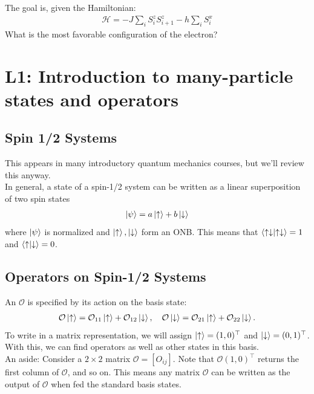 \documentclass{book}
\theoremstyle{definition}
\newcommand{\had}{\mathcal{H}}
\begin{document}
The goal is, given the Hamiltonian:
\begin{align}
\had = -J \sum_i S^z_i S^z_{i+1} - h \sum_i S^x_i
\end{align}
What is the most favorable configuration of the electron?

\section{L1: Introduction to many-particle states and operators}

\subsection{Spin 1/2 Systems} 

This appears in many introductory quantum mechanics courses, but we'll review this anyway. \\

In general, a state of a spin-1/2 system  can be written as a linear superposition of two spin states
\begin{align}
\ket{\psi} = a\ket{\uparrow} + b\ket{\downarrow}
\end{align}
where $\ket{\psi}$ is normalized and $\ket{\uparrow},\ket{\downarrow}$ form an ONB. This means that $\braket{\uparrow\downarrow} = 1$ and $\braket{\uparrow}{\downarrow} = 0$. 

\subsection{Operators on Spin-1/2 Systems}
An $\mathcal{O}$ is specified by its action on the basis state: 
\begin{align}
\mathcal{O}\ket{\uparrow} = \mathcal{O}_{11}\ket{\uparrow} + \mathcal{O}_{12}\ket{\downarrow},\quad \mathcal{O}\ket{\downarrow} = \mathcal{O}_{21}\ket{\uparrow} + \mathcal{O}_{22}\ket{\downarrow}.
\end{align}
To write in a matrix representation, we will assign $\ket{\uparrow} = (1,0)^\top$ and $\ket{\downarrow} = (0,1)^\top$. With this, we can find operators as well as other states in this basis.\\

An aside: Consider a $2\times 2$ matrix $\mathcal{O} = [O_{ij}]$. Note that $\mathcal{O}(1,0)^\top$ returns the first column of $\mathcal{O}$, and so on. This means any matrix $\mathcal{O}$ can be written as the output of $\mathcal{O}$ when fed the standard basis states. \\
\end{document}
